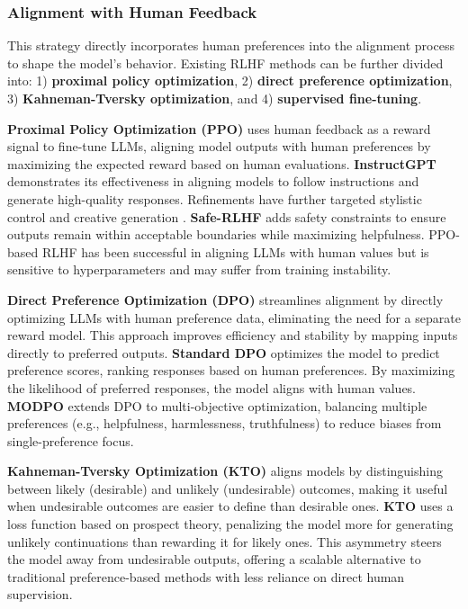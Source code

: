 \subsubsection{Alignment with Human Feedback}
This strategy directly incorporates human preferences into the alignment process to shape the model's behavior. Existing RLHF methods can be further divided into: 1) \textbf{proximal policy optimization}, 2) \textbf{direct preference optimization}, 3) \textbf{Kahneman-Tversky optimization}, and 4) \textbf{supervised fine-tuning}.

\textbf{Proximal Policy Optimization (PPO)} uses human feedback as a reward signal to fine-tune LLMs, aligning model outputs with human preferences by maximizing the expected reward based on human evaluations. \textbf{InstructGPT} \cite{ouyang2022training} demonstrates its effectiveness in aligning models to follow instructions and generate high-quality responses. Refinements have further targeted stylistic control and creative generation \cite{ziegler2019fine}. \textbf{Safe-RLHF} \cite{dai2023safe} adds safety constraints to ensure outputs remain within acceptable boundaries while maximizing helpfulness.
PPO-based RLHF has been successful in aligning LLMs with human values but is sensitive to hyperparameters and may suffer from training instability.

\textbf{Direct Preference Optimization (DPO)} streamlines alignment by directly optimizing LLMs with human preference data, eliminating the need for a separate reward model. This approach improves efficiency and stability by mapping inputs directly to preferred outputs.
\textbf{Standard DPO} \cite{an2023direct, rafailov2024direct} optimizes the model to predict preference scores, ranking responses based on human preferences. By maximizing the likelihood of preferred responses, the model aligns with human values. \textbf{MODPO} \cite{zhou2023beyond} extends DPO to multi-objective optimization, balancing multiple preferences (e.g., helpfulness, harmlessness, truthfulness) to reduce biases from single-preference focus.

\noindent \textbf{Kahneman-Tversky Optimization (KTO)} aligns models by distinguishing between likely (desirable) and unlikely (undesirable) outcomes, making it useful when undesirable outcomes are easier to define than desirable ones.
\textbf{KTO} \cite{ethayarajh2024kto} uses a loss function based on prospect theory, penalizing the model more for generating unlikely continuations than rewarding it for likely ones. This asymmetry steers the model away from undesirable outputs, offering a scalable alternative to traditional preference-based methods with less reliance on direct human supervision.

